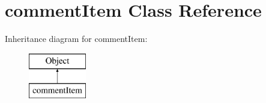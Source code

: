 \hypertarget{classcommentItem}{\section{comment\+Item Class Reference}
\label{classcommentItem}
}
Inheritance diagram for comment\+Item\+:\begin{figure}[H]
\begin{center}
\leavevmode
\includegraphics[height=2.000000cm]{classcommentItem}
\end{center}
\end{figure}

